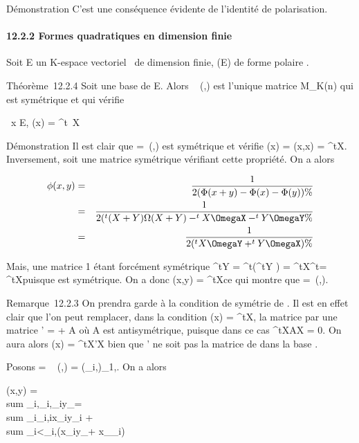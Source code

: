 \documentclass[]{article}
\begin{document}
Démonstration C'est une conséquence évidente de l'identité de
polarisation.

\paragraph{12.2.2 Formes quadratiques en dimension finie}

Soit E un K-espace vectoriel ~de dimension finie, \Phi \inQ(E) de forme
polaire \phi.

Théorème~12.2.4 Soit  une base de E. Alors
\mathrmMat~ (\phi,) est
l'unique matrice \Omega \in M\_K(n) qui est symétrique et qui vérifie

\forall~x \in E, \Phi(x) = ^t~X\OmegaX

Démonstration Il est clair que \Omega =\
\mathrmMat (\Phi,) est symétrique et vérifie \Phi(x) =
\phi(x,x) = ^tX\OmegaX. Inversement, soit \Omega une matrice symétrique
vérifiant cette propriété. On a alors

\begin{align*} \phi(x,y)& =& 1 \over
2 (\Phi(x + y) - \Phi(x) - \Phi(y)) \%& \\ &
=& 1 \over 2 (^t(X + Y )\Omega(X + Y )
-^tX\OmegaX -^tY \OmegaY \%&
\\ & =& 1 \over 2
(^tX\OmegaY + ^tY \OmegaX) \%&
\\ \end{align*}

Mais, une matrice 1  étant forcément symétrique ^tY \OmegaX =
^t(^tY \OmegaX) = ^tX^t\OmegaY =
^tX\OmegaY puisque \Omega est symétrique. On a donc \phi(x,y) =
^tX\OmegaY ce qui montre que \Omega =\
\mathrmMat (\phi,).

Remarque~12.2.3 On prendra garde à la condition de symétrie de \Omega. Il est
en effet clair que l'on peut remplacer, dans la condition \Phi(x) =
^tX\OmegaX, la matrice \Omega par une matrice \Omega' = \Omega + A où A est
antisymétrique, puisque dans ce cas ^tXAX = 0. On aura alors
\Phi(x) = ^tX\Omega'X bien que \Omega' ne soit pas la matrice de \Phi dans la
base \mathcal{E}.

Posons \Omega = \mathrmMat~ (\phi,)
= (\omega\_i,\jmath)\_1\leqi,\jmath\leqn. On a alors

\phi(x,y) = \\sum
\_i,\jmath\omega\_i,\jmathx\_iy\_\jmath =
\\sum
\_i\omega\_i,ix\_iy\_i +
\\sum
\_i\textless{}\jmath\omega\_i,\jmath(x\_iy\_\jmath +
x\_\jmathy\_i)
\end{document}
